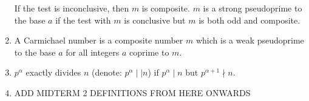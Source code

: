 \documentclass[12pt]{article}
\theoremstyle{definition}
\theoremstyle{named}
\begin{document}
\begin{enumerate}
\begin{enumerate}
        \end{enumerate}
    If the test is inconclusive, then $m$ is composite. $m$ is a strong pseudoprime to the base $a$ if the test with $m$ is conclusive but $m$ is both odd and composite. 
    \item A Carmichael number is a composite number $m$ which is a weak pseudoprime to the base $a$ for all integers $a$ coprime to $m$. 
    \item $p^\alpha$ exactly divides $n$ (denote: $p^\alpha \mid\mid n$) if $p^\alpha \mid n$ but $p^{\alpha + 1} \nmid n$. \\
    \begin{center}
        \noindent\makebox[\linewidth]{\rule{\paperwidth}{0.4pt}}
    \end{center}
    \item ADD MIDTERM 2 DEFINITIONS FROM HERE ONWARDS
\end{enumerate}
\end{document}

